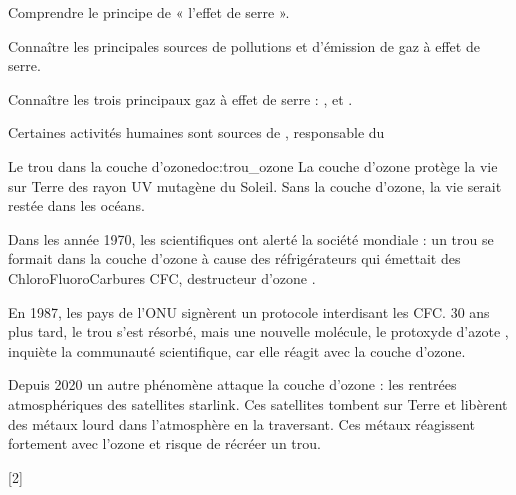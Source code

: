 \teteTermStssEnvi
{}

\begin{objectifs}
  \item Comprendre le principe de « l'effet de serre ».
  \item Connaître les principales sources de pollutions et d'émission de gaz à effet de serre.
  \item Connaître les trois principaux gaz à effet de serre : \dioxydeDeCarbone, \methane et \eau.
\end{objectifs}

\begin{contexte}
  Certaines activités humaines sont sources de , responsable du 
  
\end{contexte}

\begin{doc}{Le trou dans la couche d'ozone}{doc:trou_ozone}
  La couche d'ozone protège la vie sur Terre des rayon UV mutagène du Soleil.
  Sans la couche d'ozone, la vie serait restée dans les océans.

  Dans les année 1970, les scientifiques ont alerté la société mondiale : un trou se formait dans la couche d'ozone à cause des réfrigérateurs qui émettait des ChloroFluoroCarbures CFC, destructeur d'ozone .

  En 1987, les pays de l'ONU signèrent un protocole interdisant les CFC.
  30 ans plus tard, le trou s'est résorbé, mais une nouvelle molécule, le protoxyde d'azote , inquiète la communauté scientifique, car elle réagit avec la couche d'ozone.
  
  Depuis 2020 un autre phénomène attaque la couche d'ozone : les rentrées atmosphériques des satellites starlink.
  Ces satellites tombent sur Terre et libèrent des métaux lourd dans l’atmosphère en la traversant.
  Ces métaux réagissent fortement avec l'ozone et risque de récréer un trou.
\end{doc}

[2]


